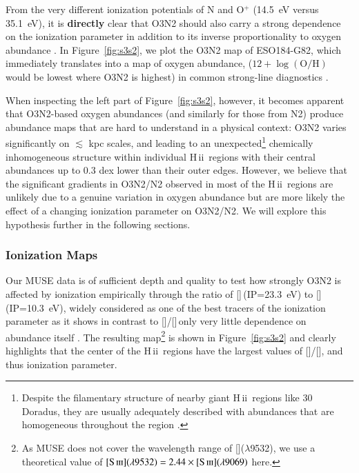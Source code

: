 \documentclass[traditabstract]{aa}
\newcommand{\hii}{\mbox{H\,{\sc ii}}}
\newcommand{\oh}{12+\log(\mathrm{O/H})}
\newcommand{\sii}{[\ion{S}{ii}]}
\newcommand{\siii}{[\ion{S}{iii}]}
\newcommand{\oii}{[\ion{O}{ii}]}
\newcommand{\oiii}{[\ion{O}{iii}]}
\begin{document}
From the very different ionization potentials of N and O$^{+}$ (14.5~eV versus 35.1~eV), it is \textbf{directly} clear that O3N2 should also carry a strong dependence on the ionization parameter in addition to its inverse proportionality to oxygen abundance \citep[e.g.][]{1979A&A....78..200A, 2015MNRAS.448.2030H}. In Figure~\ref{fig:s3s2}, we plot the O3N2 map of ESO184-G82, which immediately translates into a map of oxygen abundance, ($\oh$\,would be lowest where O3N2 is highest) in common strong-line diagnostics \citep{2004MNRAS.348L..59P}.

When inspecting the left part of Figure~\ref{fig:s3s2}, however, it becomes apparent that O3N2-based oxygen abundances (and similarly for those from N2) produce abundance maps that are hard to understand in a physical context: O3N2 varies significantly on $\lesssim$ kpc scales, and leading to an unexpected\footnote{Despite the filamentary structure of nearby giant \hii~regions like 30 Doradus, they are usually adequately described with abundances that are homogeneous throughout the region \citep[e.g.][and references therein]{2011ApJ...738...34P}.} chemically inhomogeneous structure within individual \hii~regions with their central abundances up to 0.3 dex lower than their outer edges. However, we believe that the significant gradients in O3N2/N2 observed in most of the \hii~regions are unlikely due to a genuine variation in oxygen abundance but are more likely the effect of a changing ionization parameter on O3N2/N2. We will explore this hypothesis further in the following sections.

\subsubsection{Ionization Maps}

Our MUSE data is of sufficient depth and quality to test how strongly O3N2 is affected by ionization empirically through the ratio of \siii\,(IP=23.3~eV) to \sii\,(IP=10.3~eV), widely considered as one of the best tracers of the ionization parameter \citep{1991MNRAS.253..245D} as it shows in contrast to \oiii/\oii\,only very little dependence on abundance itself \citep{2002ApJS..142...35K, 2011MNRAS.415.3616D}. The resulting map\footnote{As MUSE does not cover the wavelength range of \siii($\lambda$9532), we use a theoretical value of $\siii(\lambda9532)=2.44\times\siii(\lambda9069)$ \citep{1982MNRAS.199.1025M} here.} is shown in Figure~\ref{fig:s3s2} and clearly highlights that the center of the \hii~regions have the largest values of \siii/\sii, and thus ionization parameter. 
\end{document}
